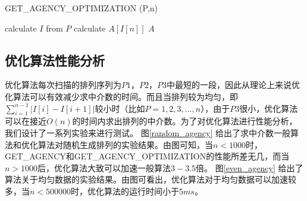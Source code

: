 \documentclass[6pt, twocolumn]{ctexart}
\begin{document}

\begin{algorithm}
\caption{GET\_AGENCY\_OPTIMIZATION (P,n)}
\label{get_agency_optimization}
\begin{algorithmic}[1]
\STATE calculate $I$ from $P$
\STATE calculate $A[I[n]]$
\ELSE 
{}
\ELSE
{}
\ENDIF
\ENDIF
\ENDFOR
\RETURN $A$
\end{algorithmic}
\end{algorithm}


\subsection{优化算法性能分析}
优化算法每次扫描的排列序列为$P1$，$P2$，$P3$中最短的一段，因此从理论上来说优化算法可以有效减少求中介数的时间。而且当排列较为均匀，即$\sum_{i=1}^{n-1}\left|I[i]-I[i+1]\right|$较小时（比如$P=1,2,3,...,n$），由于$P3$很小，优化算法可以在接近$O(n)$的时间内求出排列的中介数。为了对优化算法进行性能分析，我们设计了一系列实验来进行测试。
图\ref{random_agency} 给出了求中介数一般算法和优化算法对随机生成排列的实验结果。由图可知，当$n<1000$时，GET\_AGENCY和GET\_AGENCY\_OPTIMIZATION的性能所差无几，而当$n>1000$后，优化算法大致可以加速一般算法$3-3.5$倍。
图\ref{even_agency} 给出了算法关于均匀数据的实验结果。由图可看出，优化算法对于均匀数据可以加速较多，当$n<500000$时，优化算法的运行时间小于$5ms$。
\end{document}
